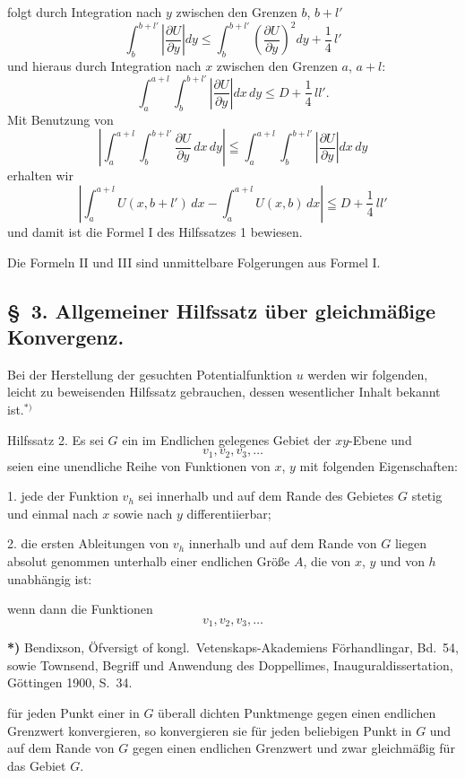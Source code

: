 \documentclass{article}
\begin{document}
folgt durch Integration nach $y$ zwischen den Grenzen $b$, $b+l'$
\[
\int_b^{b+l'} \left|\frac{\partial U}{\partial y}\right| dy \le \int_b^{b+l'} \left(\frac{\partial U}{\partial y}\right)^2 dy + \frac{1}{4}\,l'
\]
und hieraus durch Integration nach $x$ zwischen den Grenzen $a$, $a+l$:
\[
\int_a^{a+l} \int_b^{b+l'} \left|\frac{\partial U}{\partial y}\right| dx\,dy \le D + \frac{1}{4}\,l l'.
\]
Mit Benutzung von
\[
\left| \int_a^{a+l} \int_b^{b+l'} \frac{\partial U}{\partial y}\,dx\,dy \right| \leqq \int_a^{a+l} \int_b^{b+l'} \left|\frac{\partial U}{\partial y}\right| dx\,dy
\]
erhalten wir
\[
\left| \int_a^{a+l} U(x, b+l')\,dx - \int_a^{a+l} U(x, b)\,dx \right| \leqq D + \frac{1}{4}\,l l'
\]
und damit ist die Formel I des Hilfssatzes 1 bewiesen.

Die Formeln II und III sind unmittelbare Folgerungen aus Formel I.

\subsection*{§~3. Allgemeiner Hilfssatz über gleichmäßige Konvergenz.}

Bei der Herstellung der gesuchten Potentialfunktion $u$ werden wir folgenden, leicht zu beweisenden Hilfssatz gebrauchen, dessen wesentlicher Inhalt bekannt ist.${}^{*)}$

Hilfssatz 2. Es sei $G$ ein im Endlichen gelegenes Gebiet der $xy$-Ebene und
\[
v_1, v_2, v_3, \dots
\]
seien eine unendliche Reihe von Funktionen von $x$, $y$ mit folgenden Eigenschaften:

1. jede der Funktion $v_h$ sei innerhalb und auf dem Rande des Gebietes $G$ stetig und einmal nach $x$ sowie nach $y$ differentiierbar;

2. die ersten Ableitungen von $v_h$ innerhalb und auf dem Rande von $G$ liegen absolut genommen unterhalb einer endlichen Größe $A$, die von $x$, $y$ und von $h$ unabhängig ist:

wenn dann die Funktionen
\[
v_1, v_2, v_3, \dots
\]

\textbf{*)} Bendixson, Öfversigt of kongl.\ Vetenskaps-Akademiens Förhandlingar, Bd.~54, sowie Townsend, Begriff und Anwendung des Doppellimes, Inauguraldissertation, Göttingen 1900, S.~34.

für jeden Punkt einer in $G$ überall dichten Punktmenge gegen einen endlichen Grenzwert konvergieren, so konvergieren sie für jeden beliebigen Punkt in $G$ und auf dem Rande von $G$ gegen einen endlichen Grenzwert und zwar gleichmäßig für das Gebiet $G$.
\end{document}

